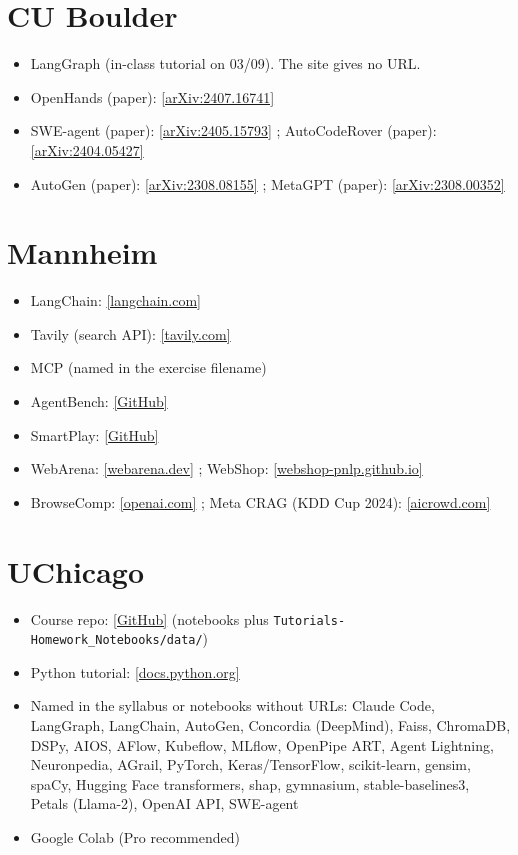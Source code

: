 \documentclass[10pt,oneside]{report}
\begin{document}
\section{CU Boulder}
{\small\begin{itemize}
\item LangGraph (in-class tutorial on 03/09). The site gives no URL.
\item OpenHands (paper): \href{https://arxiv.org/pdf/2407.16741}{[arXiv:2407.16741]}
\item SWE-agent (paper): \href{https://arxiv.org/pdf/2405.15793}{[arXiv:2405.15793]} ; AutoCodeRover (paper): \href{https://arxiv.org/pdf/2404.05427}{[arXiv:2404.05427]}
\item AutoGen (paper): \href{https://arxiv.org/pdf/2308.08155}{[arXiv:2308.08155]} ; MetaGPT (paper): \href{https://arxiv.org/pdf/2308.00352}{[arXiv:2308.00352]}
\end{itemize}}
\section{Mannheim}
{\small\begin{itemize}
\item LangChain: \href{https://www.langchain.com/langchain}{[langchain.com]}
\item Tavily (search API): \href{https://www.tavily.com/}{[tavily.com]}
\item MCP (named in the exercise filename)
\item AgentBench: \href{https://github.com/THUDM/AgentBench}{[GitHub]}
\item SmartPlay: \href{https://github.com/microsoft/SmartPlay}{[GitHub]}
\item WebArena: \href{https://webarena.dev/}{[webarena.dev]} ; WebShop: \href{https://webshop-pnlp.github.io/}{[webshop-pnlp.github.io]}
\item BrowseComp: \href{https://openai.com/index/browsecomp/}{[openai.com]} ; Meta CRAG (KDD Cup 2024): \href{https://www.aicrowd.com/challenges/meta-comprehensive-rag-benchmark-kdd-cup-2024}{[aicrowd.com]}
\end{itemize}}
\section{UChicago}
{\small\begin{itemize}
\item Course repo: \href{https://github.com/KnowledgeLab/AI-Agents-for-Social-Science-and-Society-2026}{[GitHub]} (notebooks plus \texttt{Tutorials-Homework\_\allowbreak{}Notebooks/\allowbreak{}data/\allowbreak{}})
\item Python tutorial: \href{https://docs.python.org/3/tutorial/}{[docs.python.org]}
\item Named in the syllabus or notebooks without URLs: Claude Code, LangGraph, LangChain, AutoGen, Concordia (DeepMind), Faiss, ChromaDB, DSPy, AIOS, AFlow, Kubeflow, MLflow, OpenPipe ART, Agent Lightning, Neuronpedia, AGrail, PyTorch, Keras/TensorFlow, scikit-learn, gensim, spaCy, Hugging Face transformers, shap, gymnasium, stable-baselines3, Petals (Llama-2), OpenAI API, SWE-agent
\item Google Colab (Pro recommended)
\end{itemize}}
\end{document}
